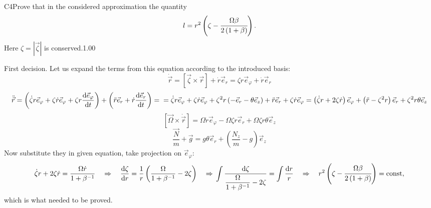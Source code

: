 \documentclass[11pt,a4paper]{article}
\begin{document}
\begin{solcard}{C4}{Prove that in the considered approximation the quantity $$ l = r^2 \left( \zeta-\cfrac{\Omega\beta}{2\left(1+\beta\right)} \right). $$Here $\zeta = |\vec{\zeta}|$ is conserved.}{1.00}

First decision. Let us expand the terms from this equation according to the introduced basis: $$ \dot{\vec r} = \left[\vec \zeta \times \vec r\right] + \dot r \vec e_r = \zeta r \vec e_\varphi + \dot r \vec e_r $$ $$ \ddot{\vec r} = \left( \dot \zeta r \vec e_\varphi + \zeta \dot r \vec e_\varphi + \zeta r \frac{\text{d} \vec e_\varphi}{\text{d} t} \right) + \left( \ddot r \vec e_r + \dot r \frac{\text{d} \vec e_r}{\text{d} t} \right) =\\= \dot \zeta r \vec e_\varphi + \zeta \dot r \vec e_\varphi + \zeta^2 r \left(-\vec e_r - \theta \vec e_z\right) + \ddot r \vec e_r + \zeta \dot r \vec e_\varphi = \left(\dot \zeta r + 2 \zeta \dot r\right) \vec e_\varphi + \left(\ddot r - \zeta^2 r\right) \vec e_r + \zeta^2 r \theta \vec e_z $$ $$ \left[\vec \Omega \times \dot{\vec r}\right] = \Omega \dot r \vec e_\varphi - \Omega \zeta r \vec e_r + \Omega \zeta r \theta \vec e_z $$ $$ \frac{\vec N}{m} + \vec g = g \theta \vec e_r + \left( \frac{N_z}{m} - g \right) \vec e_z $$ Now substitute they in given equation, take projection on $\vec e_\varphi$: $$ \dot \zeta r + 2 \zeta \dot r = \frac{\Omega \dot r}{1 + \beta^{-1}} \quad \Rightarrow \quad \frac{\text d \zeta}{\text d r} = \frac{1}{r} \left( \frac{\Omega}{1 + \beta^{-1}} - 2 \zeta \right) \quad \Rightarrow\\ \int \frac{\text d \zeta}{\dfrac{\Omega}{1 + \beta^{-1}} - 2 \zeta} = \int \frac{\text d r}{r} \quad \Rightarrow \quad r^2 \left( \zeta-\cfrac{\Omega\beta}{2\left(1+\beta\right)} \right) = \text{const}, $$ which is what needed to be proved.



\end{solcard}
\end{document}
